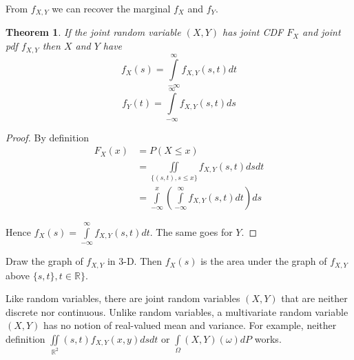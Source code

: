 \documentclass[12pt]{amsart}
\newtheorem{theorem}{Theorem}[section]
\theoremstyle{definition}
\begin{document}
From $f_{X, Y}$ we can recover the marginal $f_X$ and $f_Y$.

\begin{theorem} If the joint random variable $(X, Y)$ has joint CDF $F_X$ and joint pdf $f_{X, Y}$ then $X$ and $Y$ have
$$f_X(s) = \int\limits_{-\infty}^{\infty} f_{X, Y}(s, t) dt$$
$$f_Y(t) = \int\limits_{-\infty}^{\infty} f_{X, Y}(s, t) ds$$
\end{theorem}
\begin{proof} By definition
\begin{align*}
F_X(x) & = P(X \leq x) \\
 & = \iint\limits_{\{(s, t), s \leq x\}} f_{X, Y}(s, t) ds dt \\
 & = \int\limits_{-\infty}^x \left( \int\limits_{-\infty}^{\infty} f_{X, Y}(s, t) dt \right)ds
\end{align*}

Hence $f_X(s) = \int\limits_{-\infty}^{\infty} f_{X, Y}(s, t) dt$. The same goes for $Y$.
\end{proof}

Draw the graph of $f_{X, Y}$ in 3-D. Then $f_X(s)$ is the area under the graph of $f_{X, Y}$ above $\{s,t\}, t \in \mathbb{R}\}$.

Like random variables, there are joint random variables $(X, Y)$ that are neither discrete nor continuous. Unlike random variables, a multivariate random variable $(X, Y)$ has no notion of real-valued mean and variance. For example, neither definition $\iint\limits_{\mathbb{R}^2} (s, t) f_{X, Y}(x, y) ds dt$ or $\int\limits_{\Omega} (X, Y)(\omega) dP$ works.
\end{document}
